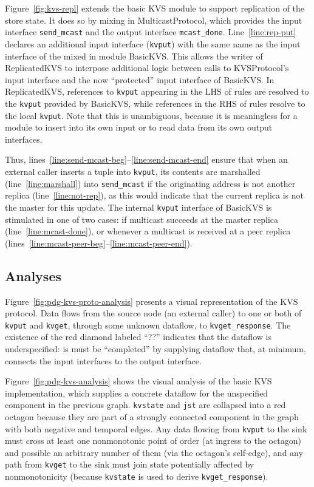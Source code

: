 Figure~\ref{fig:kvs-repl} extends the basic KVS module to support replication of
the store state.  It does so by mixing in MulticastProtocol, which provides the
input interface \texttt{send\_mcast} and the output interface
\texttt{mcast\_done}.  Line~\ref{line:rep-put} declares an additional input
interface (\texttt{kvput}) with the same name as the input interface of the
mixed in module BasicKVS.  This allows the writer of ReplicatedKVS to interpose
additional logic between calls to KVSProtocol's input interface and the now
``protected'' input interface of BasicKVS.  In ReplicatedKVS, references to
\texttt{kvput} appearing in the LHS of rules are resolved to the \texttt{kvput}
provided by BasicKVS, while references in the RHS of rules resolve to the local
\texttt{kvput}.  Note that this is unambiguous, because it is meaningless for a
module to insert into its own input or to read data from its own output
interfaces.

Thus, lines~\ref{line:send-mcast-beg}--\ref{line:send-mcast-end} ensure that when an external caller inserts a tuple into
\texttt{kvput}, its contents are marshalled (line~\ref{line:marshall}) into \texttt{send\_mcast}
if the originating address is not another replica (line~\ref{line:not-rep}), as this would indicate
that the current replica is not the master for this update.  
The internal
\texttt{kvput} interface of BasicKVS is stimulated in one of two cases: if multicast succeeds
at the master replica (line~\ref{line:mcast-done}), or whenever a multicast is received at 
a peer replica (lines~\ref{line:mcast-peer-beg}--\ref{line:mcast-peer-end}).

\subsection{Analyses}
Figure~\ref{fig:pdg-kvs-proto-analysis} presents a visual representation of the KVS protocol.  Data
flows from the source node (an external caller) to one or both of \texttt{kvput} and 
\texttt{kvget}, through some unknown dataflow, to \texttt{kvget\_response}.
The existence of the red diamond labeled ``??'' indicates that the dataflow is underspecified:
is must be ``completed'' by supplying dataflow that, at minimum, connects the input 
interfaces to the output interface.

Figure~\ref{fig:pdg-kvs-analysis} shows the visual analysis of the basic KVS
implementation, which supplies a concrete dataflow for the unspecified component
in the previous graph.  \texttt{kvstate} and \texttt{jst} are collapsed into a
red octagon because they are part of a strongly connected component in the graph
with both negative and temporal edges.  Any data flowing from \texttt{kvput} to
the sink must cross at least one nonmonotonic point of order (at ingress to the
octagon) and possible an arbitrary number of them (via the octagon's self-edge),
and any path from \texttt{kvget} to the sink must join state potentially
affected by nonmonotonicity (because \texttt{kvstate} is used to derive
\texttt{kvget\_response}).

